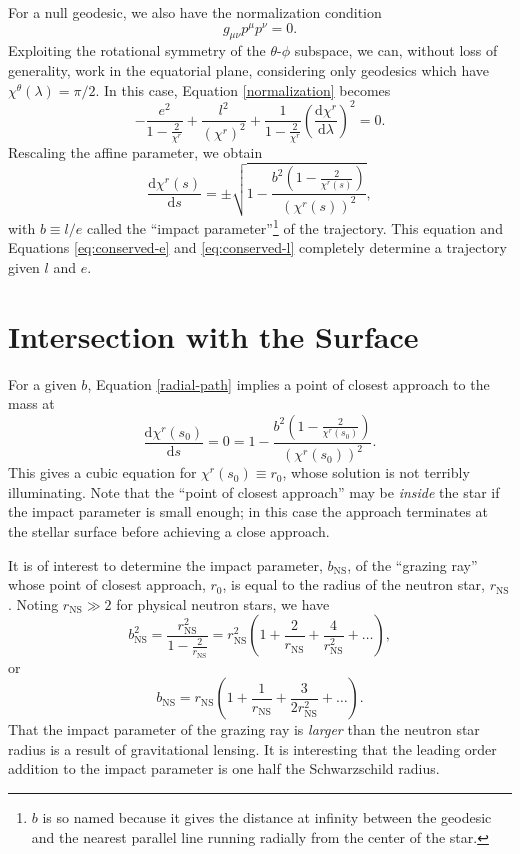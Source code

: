 \documentclass[modern]{aastex631}
\newcommand{\dd}{\mathrm{d}}
\newcommand{\bNS}{b_\mathrm{NS}}
\newcommand{\rNS}{r_\mathrm{NS}}
\begin{document}
For a null geodesic, we also have the normalization condition 
\begin{equation}
\label{normalization}
g_{\mu \nu} p^\mu p^\nu = 0.
\end{equation}
Exploiting the rotational symmetry of the $\theta$-$\phi$ subspace, we can,
without loss of generality, work in the equatorial plane, considering only
geodesics which have $\chi^\theta (\lambda) = \pi /2$.  In this case, Equation
\ref{normalization} becomes
\begin{equation}
    \label{eq:pr-normalization}
-\frac{e^2}{1 - \frac{2}{\chi^r}} + \frac{l^2}{(\chi^r)^2} + \frac{1}{1-\frac{2}{\chi^r}} \left( \frac{\dd \chi^r}{\dd \lambda} \right)^2 = 0.
\end{equation}
Rescaling the affine parameter, we obtain
\begin{equation}
\label{radial-path}
\frac{\dd \chi^r(s)}{\dd s} = \pm \sqrt{1 - \frac{b^2\left(1 - \frac{2}{\chi^r(s)} \right)}{(\chi^r(s))^2}},
\end{equation}
with $b \equiv l/e$ called the ``impact parameter''\footnote{$b$ is so named
because it gives the distance at infinity between the geodesic and the nearest
parallel line running radially from the center of the star.} of the trajectory.
This equation and Equations \ref{eq:conserved-e} and \ref{eq:conserved-l}
completely determine a trajectory given $l$ and $e$.  

\section{Intersection with the Surface}
\label{sec:surface}

For a given $b$, Equation \ref{radial-path} implies a point of closest approach
to the mass at 
\begin{equation}
\frac{\dd \chi^r(s_0)}{\dd s} = 0 = 1 - \frac{b^2 \left( 1 - \frac{2}{\chi^r\left(s_0\right)} \right)}{(\chi^r(s_0))^2}.
\end{equation}
This gives a cubic equation for $\chi^r(s_0)\equiv r_0$, whose solution is not
terribly illuminating.  Note that the ``point of closest approach'' may be
\emph{inside} the star if the impact parameter is small enough; in this case the
approach terminates at the stellar surface before achieving a close approach.

It is of interest to determine the impact parameter, $\bNS$, of the ``grazing
ray'' whose point of closest approach, $r_0$, is equal to the radius of the
neutron star, $\rNS$.  Noting $\rNS \gg 2$ for physical neutron stars, we have 
\begin{equation}
     \bNS^2 = \frac{\rNS^2}{1 - \frac{2}{\rNS}} = \rNS^2 \left( 1 + \frac{2}{\rNS} + \frac{4}{\rNS^2} + \ldots \right),
\end{equation}
or 
\begin{equation}
    \bNS = \rNS \left( 1 + \frac{1}{\rNS} + \frac{3}{2 \rNS^2} + \ldots \right).
\end{equation}
That the impact parameter of the grazing ray is \emph{larger} than the neutron
star radius is a result of gravitational lensing.  It is interesting that the
leading order addition to the impact parameter is one half the Schwarzschild
radius.
\end{document}
